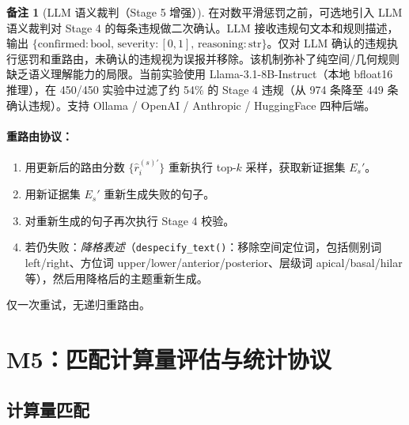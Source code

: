 \documentclass[11pt,a4paper]{article}
\theoremstyle{definition}
\newtheorem{remark}{备注}[section]
\begin{document}
\begin{remark}[LLM 语义裁判（Stage 5 增强）]\label{rmk:llm_judge}
在对数平滑惩罚之前，可选地引入 LLM 语义裁判对 Stage 4 的每条违规做二次确认。LLM 接收违规句文本和规则描述，输出 $\{\mathrm{confirmed}: \mathrm{bool},\, \mathrm{severity}: [0,1],\, \mathrm{reasoning}: \mathrm{str}\}$。仅对 LLM 确认的违规执行惩罚和重路由，未确认的违规视为误报并移除。该机制弥补了纯空间/几何规则缺乏语义理解能力的局限。当前实验使用 Llama-3.1-8B-Instruct（本地 bfloat16 推理），在 450/450 实验中过滤了约 54\% 的 Stage 4 违规（从 974 条降至 449 条确认违规）。支持 Ollama / OpenAI / Anthropic / HuggingFace 四种后端。
\end{remark}

\paragraph{重路由协议：}
\begin{enumerate}
    \item 用更新后的路由分数 $\{\hat{r}_i^{(s)\prime}\}$ 重新执行 top-$k$ 采样，获取新证据集 $E_s'$。
    \item 用新证据集 $E_s'$ 重新生成失败的句子。
    \item 对重新生成的句子再次执行 Stage 4 校验。
    \item 若仍失败：\emph{降格表述}（\texttt{despecify\_text()}：移除空间定位词，包括侧别词 left/right、方位词 upper/lower/anterior/posterior、层级词 apical/basal/hilar 等），然后用降格后的主题重新生成。
\end{enumerate}
仅一次重试，无递归重路由。


\section{M5：匹配计算量评估与统计协议}


\subsection{计算量匹配}
\end{document}
